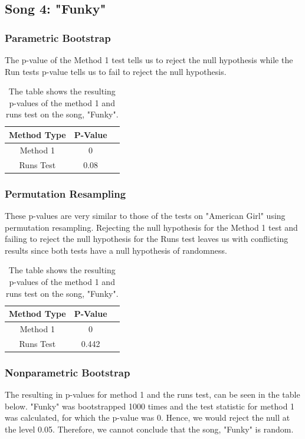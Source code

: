 \documentclass[12pt, letterpaper]{article}
\begin{document}
\subsection{Song 4: "Funky"}
\subsubsection{Parametric Bootstrap}
The p-value of the Method 1 test tells us to reject the null hypothesis while the Run tests p-value tells us to fail to reject the null hypothesis.
\begin{table}[h]
\begin{center}
\begin{tabular}{|c|c|c|}
\hline
\textbf{Method Type} & P-Value \\
\hline
Method 1 & 0 \\
\hline
Runs Test & 0.08  \\ 
\hline
\end{tabular} 
\end{center}
\caption{The table shows the resulting p-values of the method 1 and runs test on the song, "Funky".}
\label{fig: P-values for "Funky": Parametric Bootstrap}
\end{table}

\subsubsection{Permutation Resampling}
These p-values are very similar to those of the tests on "American Girl" using permutation resampling. Rejecting the null hypothesis for the Method 1 test and failing to reject the null hypothesis for the Runs test leaves us with conflicting results since both tests have a null hypothesis of randomness. 
\begin{table}[h]
\begin{center}
\begin{tabular}{|c|c|c|}
\hline
\textbf{Method Type} & P-Value \\
\hline
Method 1 & 0 \\
\hline
Runs Test & 0.442  \\ 
\hline
\end{tabular}
\end{center}
\caption{The table shows the resulting p-values of the method 1 and runs test on the song, "Funky".}
\label{fig: P-values for "Funky": Permutation Resampling}
\end{table}

\subsubsection{Nonparametric Bootstrap}
The resulting in p-values for method 1 and the runs test, can be seen in the table below. "Funky" was bootstrapped 1000 times and the test statistic for method 1 was calculated, for which the p-value was 0. Hence, we would reject the null at the level 0.05. Therefore, we cannot conclude that the song, "Funky" is random. 
\end{document}
